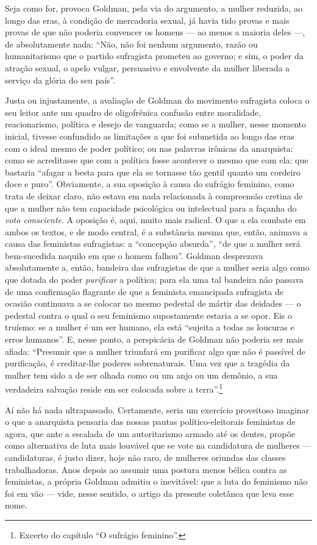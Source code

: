 Seja
como for, provoca Goldman, pela via do argumento, a mulher reduzida, ao
longo das eras, à condição de mercadoria sexual, já havia tido provas e
mais provas de que não poderia convencer os homens --- ao menos a maioria
deles ---, de absolutamente nada: ``Não, não foi nenhum argumento, razão
ou humanitarismo que o partido sufragista prometeu ao governo; e sim, o
poder da atração sexual, o apelo vulgar, persuasivo e envolvente da
mulher liberada a serviço da glória do seu país''.

Justa ou injustamente, a avaliação de Goldman do movimento sufragista
coloca o seu leitor ante um quadro de oligofrênica confusão entre
moralidade, reacionarismo, política e desejo de vanguarda; como se a
mulher, nesse momento inicial, tivesse confundido as limitações a que
foi submetida ao longo das eras com o ideal mesmo de poder político; ou
nas palavras irônicas da anarquista: como se acreditasse que com a
política fosse acontecer o mesmo que com ela: que bastaria ``afagar a
besta para que ela se tornasse tão gentil quanto um cordeiro doce e
puro''. Obviamente, a sua oposição à causa do sufrágio feminino, como
trata de deixar claro, não estava em nada relacionada à compreensão
cretina de que a mulher não tem capacidade psicológica ou intelectual
para a façanha do \textit{voto consciente}. A oposição é, aqui, muito mais
radical. O que a ela combate em ambos os textos, e de modo central, é a
substância mesma que, então, animava a causa das feministas sufragistas:
a ``concepção absurda'', ``de que a mulher será bem-sucedida naquilo em
que o homem falhou''. Goldman desprezava absolutamente a, então,
bandeira das sufragistas de que a mulher seria algo como que dotada do
poder \textit{purificar} a política; para ela uma tal bandeira não passava de
uma confirmação flagrante de que a feminista emancipada sufragista de
ocasião continuava a se colocar no mesmo pedestal de mártir das deidades
--- o pedestal contra o qual o seu feminismo supostamente estaria a se
opor. Eis o truísmo: se a mulher é um ser humano, ela está ``sujeita a
todas as loucuras e erros humanos''. E, nesse ponto, a perspicácia de
Goldman não poderia ser mais afiada: ``Presumir que a mulher triunfará
em purificar algo que não é passível de purificação, é creditar-lhe
poderes sobrenaturais. Uma vez que a tragédia da mulher tem sido a de
ser olhada como ou um anjo ou um demônio, a sua verdadeira salvação
reside em ser colocada sobre a terra''.\footnote{Excerto do capítulo ``O sufrágio feminino''.}

Aí não há nada ultrapassado. Certamente, seria um exercício proveitoso
imaginar o que a anarquista pensaria das nossas pautas
político-eleitorais feministas de agora, que ante a escalada de um
autoritarismo armado até os dentes, propõe como alternativa de luta mais
louvável que se vote na candidatura de mulheres --- candidaturas, é justo
dizer, hoje não raro, de mulheres oriundas das classes trabalhadoras.
Anos depois ao assumir uma postura menos bélica contra as feministas, a
própria Goldman admitiu o inevitável: que a luta do feminismo não foi em
vão --- vide, nesse sentido, o artigo da presente coletânea que leva esse
nome. 


